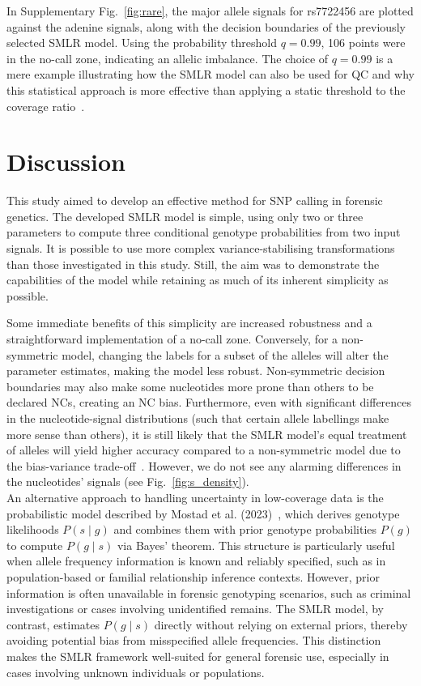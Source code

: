 \documentclass[preprint,5p,times,11pt]{elsarticle}
\begin{document}
In Supplementary Fig.~\ref{fig:rare}, the major allele signals for rs7722456 are plotted against the adenine signals, along with the decision boundaries of the previously selected SMLR model.
Using the probability threshold $q=0.99$, 106 points were in the no-call zone, indicating an allelic imbalance.
The choice of $q=0.99$ is a mere example illustrating how the SMLR model can also be used for QC and why this statistical approach is more effective than applying a static threshold to the coverage ratio~\cite[p.~35]{hid}.



\section{Discussion}
This study aimed to develop an effective method for SNP calling in forensic genetics.
The developed SMLR model is simple, using only two or three parameters to compute three conditional genotype probabilities from two input signals.
It is possible to use more complex variance-stabilising transformations than those investigated in this study.
Still, the aim was to demonstrate the capabilities of the model while retaining as much of its inherent simplicity as possible.

Some immediate benefits of this simplicity are increased robustness and a straightforward implementation of a no-call zone.
Conversely, for a non-symmetric model, changing the labels for a subset of the alleles will alter the parameter estimates, making the model less robust.
Non-symmetric decision boundaries may also make some nucleotides more prone than others to be declared NCs, creating an NC bias.
Furthermore, even with significant differences in the nucleotide-signal distributions (such that certain allele labellings make more sense than others), it is still likely that the SMLR model's equal treatment of alleles will yield higher accuracy compared to a non-symmetric model due to the bias-variance trade-off~\cite{shmueli}.
However, we do not see any alarming differences in the nucleotides' signals (see Fig.~\ref{fig:s_density}).\\


An alternative approach to handling uncertainty in low-coverage data is the probabilistic model described by Mostad et al. (2023)~\cite{mostad}, which derives genotype likelihoods $P\left(s \mid g\right)$ and combines them with prior genotype probabilities $P\left(g\right)$ to compute $P\left(g \mid s\right)$ via Bayes’ theorem.
This structure is particularly useful when allele frequency information is known and reliably specified, such as in population-based or familial relationship inference contexts.
However, prior information is often unavailable in forensic genotyping scenarios, such as criminal investigations or cases involving unidentified remains.
The SMLR model, by contrast, estimates $P\left(g \mid s\right)$ directly without relying on external priors, thereby avoiding potential bias from misspecified allele frequencies.
This distinction makes the SMLR framework well-suited for general forensic use, especially in cases involving unknown individuals or populations.\\
\end{document}
